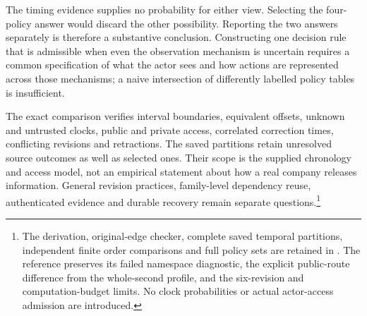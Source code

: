 The timing evidence supplies no probability for either view. Selecting the four-policy answer would discard the other possibility. Reporting the two answers separately is therefore a substantive conclusion. Constructing one decision rule that is admissible when even the observation mechanism is uncertain requires a common specification of what the actor sees and how actions are represented across those mechanisms; a naive intersection of differently labelled policy tables is insufficient.

The exact comparison verifies interval boundaries, equivalent offsets, unknown and untrusted clocks, public and private access, correlated correction times, conflicting revisions and retractions. The saved partitions retain unresolved source outcomes as well as selected ones. Their scope is the supplied chronology and access model, not an empirical statement about how a real company releases information. General revision practices, family-level dependency reuse, authenticated evidence and durable recovery remain separate questions.\footnote{The derivation, original-edge checker, complete saved temporal partitions, independent finite order comparisons and full policy sets are retained in . The reference preserves its failed namespace diagnostic, the explicit public-route difference from the whole-second profile, and the six-revision and computation-budget limits. No clock probabilities or actual actor-access admission are introduced.}
